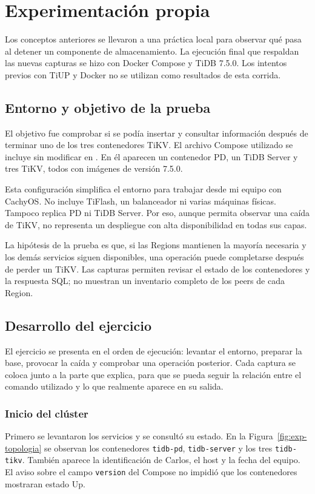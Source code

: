 \documentclass[11pt,a4paper]{article}
\begin{document}
\section{Experimentación propia}
Los conceptos anteriores se llevaron a una práctica local para observar qué pasa al detener un componente de almacenamiento. La ejecución final que respaldan las nuevas capturas se hizo con Docker Compose y TiDB 7.5.0. Los intentos previos con TiUP y Docker no se utilizan como resultados de esta corrida.

\subsection{Entorno y objetivo de la prueba}
El objetivo fue comprobar si se podía insertar y consultar información después de terminar uno de los tres contenedores TiKV. El archivo Compose utilizado se incluye sin modificar en . En él aparecen un contenedor PD, un TiDB Server y tres TiKV, todos con imágenes de versión 7.5.0.

Esta configuración simplifica el entorno para trabajar desde mi equipo con CachyOS. No incluye TiFlash, un balanceador ni varias máquinas físicas. Tampoco replica PD ni TiDB Server. Por eso, aunque permita observar una caída de TiKV, no representa un despliegue con alta disponibilidad en todas sus capas.

La hipótesis de la prueba es que, si las Regions mantienen la mayoría necesaria y los demás servicios siguen disponibles, una operación puede completarse después de perder un TiKV. Las capturas permiten revisar el estado de los contenedores y la respuesta SQL; no muestran un inventario completo de los peers de cada Region.

\subsection{Desarrollo del ejercicio}
El ejercicio se presenta en el orden de ejecución: levantar el entorno, preparar la base, provocar la caída y comprobar una operación posterior. Cada captura se coloca junto a la parte que explica, para que se pueda seguir la relación entre el comando utilizado y lo que realmente aparece en su salida.

\subsubsection{Inicio del clúster}
Primero se levantaron los servicios y se consultó su estado. En la Figura~\ref{fig:exp-topologia} se observan los contenedores \texttt{tidb-pd}, \texttt{tidb-server} y los tres \texttt{tidb-tikv}. También aparece la identificación de Carlos, el host y la fecha del equipo. El aviso sobre el campo \texttt{version} del Compose no impidió que los contenedores mostraran estado Up.
\end{document}
